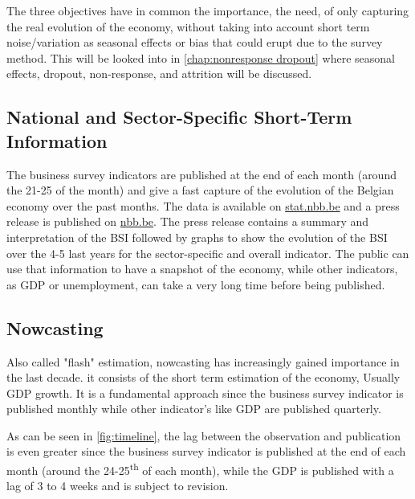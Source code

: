 \documentclass[12pt,a4paper,oneside]{book}
\begin{document}
The three objectives have in common the importance, the need,  of only capturing the real evolution of the economy, without taking into account short term noise/variation as seasonal effects or bias that could erupt due to the survey method.
This will be looked into in \autoref{chap:nonresponse dropout} where seasonal effects, dropout, non-response, and attrition will be discussed.


\subsection{National and Sector-Specific Short-Term Information}


The business survey indicators are published at the end of each month (around the 21-25 of the month) and give a fast capture of the evolution of the Belgian economy over the past months.
The data is available on \href{http://stat.nbb.be/Index.aspx?DataSetCode=BUSSURVM&Lang=en}{stat.nbb.be} and a press release is published on \href{http://www.nbb.be/doc/dq/e/conj.htm}{nbb.be}. 
The press release contains a summary and interpretation of the BSI followed by graphs to show the evolution of the BSI over the 4-5 last years for the sector-specific and overall indicator.
The public can use that information to have a snapshot of the economy, while other indicators, as GDP or unemployment, can take a very long time before being published.


\subsection{Nowcasting}
\label{sec:nowcasting}

Also called "flash" estimation, nowcasting has increasingly gained importance in the last decade.
it consists of the short term estimation of the economy, Usually GDP growth.
It is a fundamental approach since the business survey indicator is published monthly while other indicator's like GDP are published quarterly.

As can be seen in \autoref{fig:timeline}, 
the lag between the observation and publication is even greater since the business survey indicator is published at the end of each month (around the 24-25\textsuperscript{th} of each month), while the GDP is published with a lag of 3 to 4 weeks and is subject to revision.
\end{document}
